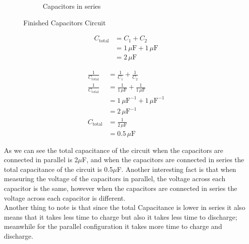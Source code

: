 \documentclass[a4paper, 10pt]{article}
\begin{document}
\begin{figure}[h!]
\begin{subfigure}{0.45\textwidth}
								\caption{Capacitors in series}
								\label{fig:finished_capacitors_series_circuit}
							\end{subfigure}
							\caption{Finished Capacitors Circuit}
							\label{fig:finished_capacitors_circuit}	
						\end{figure}

						\pagebreak%
						\begin{tcolorbox}[title=Parallel Connection]
						\[
						\begin{aligned}
							C_{\text{total}} &= C_1 + C_2 \\
							&= 1 \, \mu\text{F} + 1 \, \mu\text{F} \\
							&= 2 \, \mu\text{F}
						\end{aligned}
						\]
						\end{tcolorbox}
				
						\begin{tcolorbox}[title=Series Connection]
						\[
						\begin{aligned}
							\frac{1}{C_{\text{total}}} &= \frac{1}{C_1} + \frac{1}{C_2} \\
							\frac{1}{C_{\text{total}}} &= \frac{1}{1 \, \mu\text{F}} + \frac{1}{1 \, \mu\text{F}} \\
							&= 1 \, \mu\text{F}^{-1} + 1 \, \mu\text{F}^{-1} \\
							&= 2 \, \mu\text{F}^{-1} \\
							C_{\text{total}} &= \frac{1}{2 \, \mu\text{F}} \\
							&= 0.5 \, \mu\text{F}
						\end{aligned}
						\]
						\end{tcolorbox}
						

						\vspace{10mm}
						As we can see the total capacitance of the circuit when the capacitors are connected in parallel is 2$\mu$F, and when the capacitors are connected in series the total capacitance of the circuit is 0.5$\mu$F.
						Another interesting fact is that when measuring the voltage of the capacitors in parallel, the voltage across each capacitor is the same, however when the capacitors are connected in series the voltage across each capacitor is different. \\

						Another thing to note is that since the total Capacitance is lower in series it also means that it takes less time to charge but also it takes less time to discharge; meanwhile for the parallel configuration it takes more time to charge and discharge.
						
\end{document}
